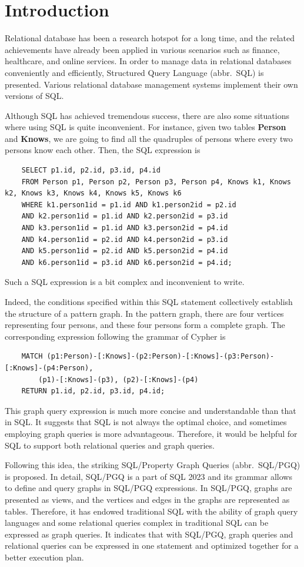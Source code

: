 \section{Introduction}

Relational database has been a research hotspot for a long time, and the related achievements have already been applied in various scenarios such as finance, healthcare, and online services.
In order to manage data in relational databases conveniently and efficiently, Structured Query Language (abbr.~SQL) is presented.
Various relational database management systems implement their own versions of SQL.

Although SQL has achieved tremendous success, there are also some situations where using SQL is quite inconvenient.
For instance, given two tables \textbf{Person} and \textbf{Knows}, we are going to find all the quadruples of persons where every two persons know each other.
Then, the SQL expression is 
\begin{lstlisting}
    SELECT p1.id, p2.id, p3.id, p4.id
    FROM Person p1, Person p2, Person p3, Person p4, Knows k1, Knows k2, Knows k3, Knows k4, Knows k5, Knows k6
    WHERE k1.person1id = p1.id AND k1.person2id = p2.id
    AND k2.person1id = p1.id AND k2.person2id = p3.id
    AND k3.person1id = p1.id AND k3.person2id = p4.id
    AND k4.person1id = p2.id AND k4.person2id = p3.id
    AND k5.person1id = p2.id AND k5.person2id = p4.id
    AND k6.person1id = p3.id AND k6.person2id = p4.id;
\end{lstlisting}
Such a SQL expression is a bit complex and inconvenient to write.


Indeed, the conditions specified within this SQL statement collectively establish the structure of a pattern graph.
In the pattern graph, there are four vertices representing four persons, and these four persons form a complete graph.
The corresponding expression following the grammar of Cypher is 
\begin{lstlisting}
    MATCH (p1:Person)-[:Knows]-(p2:Person)-[:Knows]-(p3:Person)-[:Knows]-(p4:Person),
        (p1)-[:Knows]-(p3), (p2)-[:Knows]-(p4)
    RETURN p1.id, p2.id, p3.id, p4.id;
\end{lstlisting} 
This graph query expression is much more concise and understandable than that in SQL.
It suggests that SQL is not always the optimal choice, and sometimes employing graph queries is more advantageous.
Therefore, it would be helpful for SQL to support both relational queries and graph queries.

Following this idea, the striking SQL/Property Graph Queries (abbr.~SQL/PGQ) is proposed.
In detail, SQL/PGQ is a part of SQL 2023 and its grammar allows to define and query graphs in SQL/PGQ expressions.
In SQL/PGQ, graphs are presented as views, and the vertices and edges in the graphs are represented as tables.
Therefore, it has endowed traditional SQL with the ability of graph query languages and some relational queries complex in traditional SQL can be expressed as graph queries.
It indicates that with SQL/PGQ, graph queries and relational queries can be expressed in one statement and optimized together for a better execution plan.

